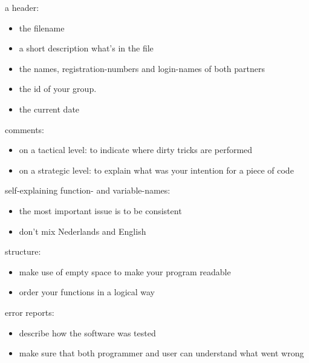 \documentclass[10pt]{scrartcl}
\begin{document}
\begin{description}
\addtolength{\itemsep}{-.05cm}
\item a header:   
\addtolength{\itemsep}{-.05cm}
  \begin{itemize}
    \addtolength{\itemsep}{-.05cm}
    \item the filename
    \item a short description what's in the file
    \item the names, registration-numbers and login-names of both partners
    \item the id of your group.
    \item the current date
  \end{itemize}
\item comments:   
  \begin{itemize}
    \addtolength{\itemsep}{-.05cm}
    \item on a tactical level: to indicate where dirty tricks are performed
    \item on a strategic level: to explain what was your intention
      for a piece of code
  \end{itemize}
\item self-explaining function- and variable-names:   
  \begin{itemize}
    \addtolength{\itemsep}{-.05cm}
    \item the most important issue is to be consistent
    \item don't mix Nederlands and English
  \end{itemize}
\item structure:   
  \begin{itemize}
    \addtolength{\itemsep}{-.05cm}
    \item make use of empty space to make your program readable
    \item order your functions in a logical way
  \end{itemize}
\item error reports:   
  \begin{itemize}
    \addtolength{\itemsep}{-.05cm}
    \item describe how the software was tested
    \item make sure that both programmer and user can understand
      what went wrong
  \end{itemize}
\end{description}

\end{document}
